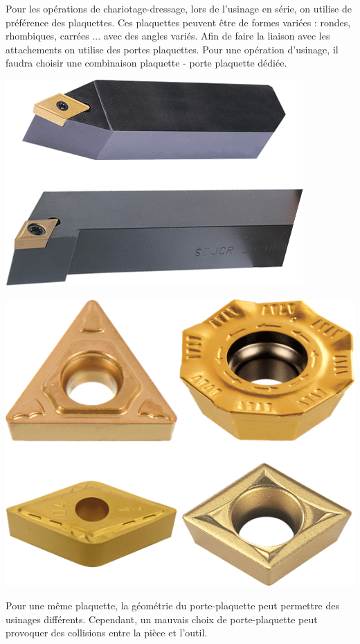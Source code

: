 \documentclass[11pt,oneside]{article}
\begin{document}
\begin{minipage}[c]{.65\linewidth}
Pour les opérations de chariotage-dressage, lors de l'usinage en série, on utilise de préférence des plaquettes. Ces plaquettes peuvent être de formes variées : rondes, rhombiques, carrées ... avec des angles variés. Afin de faire la liaison avec les attachements on utilise des portes plaquettes. Pour une opération d'usinage, il faudra choisir une combinaison plaquette - porte plaquette dédiée. 
\end{minipage} \hfill
\begin{minipage}[c]{.3\linewidth}
\begin{center}
\includegraphics[width=.7\textwidth]{png/pp.png}

\includegraphics[width=.55\textwidth]{png/outils_plaq}
\end{center}
\end{minipage}




Pour une même plaquette, la géométrie du porte-plaquette peut permettre des usinages différents. Cependant, un mauvais choix de porte-plaquette peut provoquer des collisions entre la pièce et l'outil.
\end{document}

